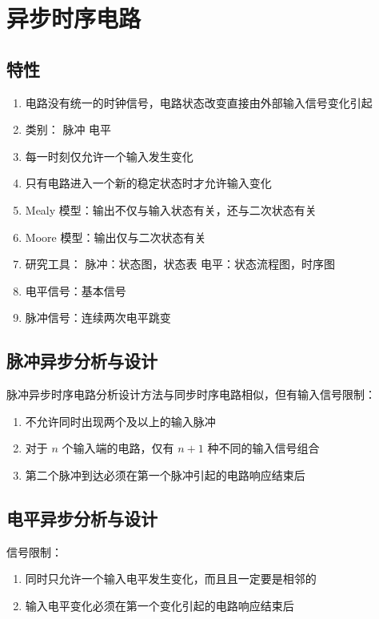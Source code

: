 \chapter{异步时序电路}
\newpage

\section{特性}
\begin{enumerate}
    \item 电路没有统一的时钟信号，电路状态改变直接由外部输入信号变化引起
    \item 类别：
        脉冲
        电平
    \item 每一时刻仅允许一个输入发生变化
    \item 只有电路进入一个新的稳定状态时才允许输入变化
    \item Mealy 模型：输出不仅与输入状态有关，还与二次状态有关
    \item Moore 模型：输出仅与二次状态有关
    \item 研究工具：
        脉冲：状态图，状态表
        电平：状态流程图，时序图
    \item 电平信号：基本信号
    \item 脉冲信号：连续两次电平跳变
\end{enumerate}


\section{脉冲异步分析与设计}

脉冲异步时序电路分析设计方法与同步时序电路相似，但有输入信号限制：
\begin{enumerate}
    \item 不允许同时出现两个及以上的输入脉冲
    \item 对于 $n$ 个输入端的电路，仅有 $n+1$ 种不同的输入信号组合
    \item 第二个脉冲到达必须在第一个脉冲引起的电路响应结束后 
\end{enumerate}

\section{电平异步分析与设计}

信号限制：
\begin{enumerate}
    \item 同时只允许一个输入电平发生变化，而且且一定要是相邻的
    \item 输入电平变化必须在第一个变化引起的电路响应结束后
\end{enumerate}

